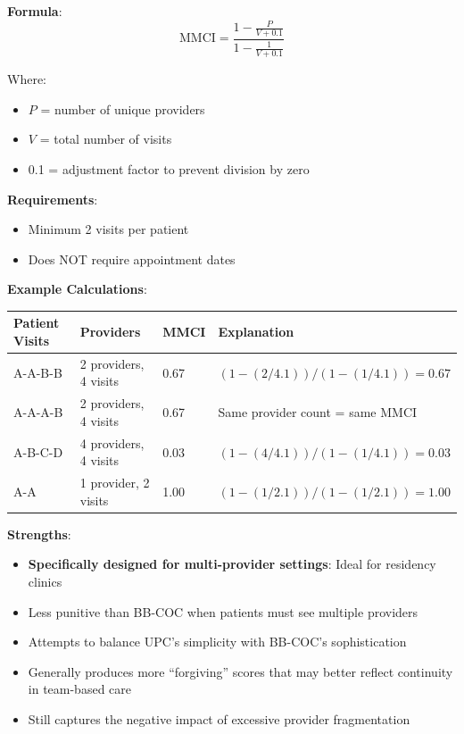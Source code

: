 \documentclass[11pt,a4paper]{article}
\newcommand{\mmci}{\text{MMCI}}
\begin{document}
\textbf{Formula}:
\begin{equation}
\mmci = \frac{1 - \frac{P}{V+0.1}}{1 - \frac{1}{V+0.1}}
\end{equation}

Where:
\begin{itemize}
\item $P$ = number of unique providers
\item $V$ = total number of visits
\item 0.1 = adjustment factor to prevent division by zero
\end{itemize}

\textbf{Requirements}:
\begin{itemize}
\item Minimum 2 visits per patient
\item Does NOT require appointment dates
\end{itemize}

\textbf{Example Calculations}:
\begin{table}[h]
\centering
\begin{tabular}{llll}
\toprule
Patient Visits & Providers & MMCI & Explanation \\
\midrule
A-A-B-B & 2 providers, 4 visits & 0.67 & $(1-(2/4.1))/(1-(1/4.1)) = 0.67$ \\
A-A-A-B & 2 providers, 4 visits & 0.67 & Same provider count = same MMCI \\
A-B-C-D & 4 providers, 4 visits & 0.03 & $(1-(4/4.1))/(1-(1/4.1)) = 0.03$ \\
A-A & 1 provider, 2 visits & 1.00 & $(1-(1/2.1))/(1-(1/2.1)) = 1.00$ \\
\bottomrule
\end{tabular}
\end{table}

\textbf{Strengths}:
\begin{itemize}
\item \textbf{Specifically designed for multi-provider settings}: Ideal for residency clinics
\item Less punitive than BB-COC when patients must see multiple providers
\item Attempts to balance UPC's simplicity with BB-COC's sophistication
\item Generally produces more ``forgiving'' scores that may better reflect continuity in team-based care
\item Still captures the negative impact of excessive provider fragmentation
\end{itemize}
\end{document}
